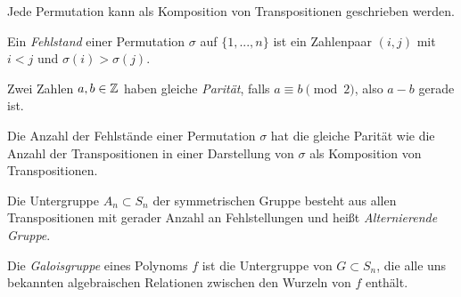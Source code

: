 \documentclass{cheat-sheet}
\begin{document}
\begin{bem}
  Jede Permutation kann als Komposition von Transpositionen geschrieben werden.
\end{bem}

\begin{defn}
  Ein \emph{Fehlstand} einer Permutation $\sigma$ auf $\{ 1, ..., n \}$ ist ein Zahlenpaar $(i, j)$ mit $i < j$ und $\sigma(i) > \sigma(j)$.
\end{defn}

\begin{defn}
  Zwei Zahlen $a, b \in \mathbb{Z}$ haben gleiche \emph{Parität}, falls $a \equiv b \pmod{2}$, also $a - b$ gerade ist.
\end{defn}

\begin{prop}
  Die Anzahl der Fehlstände einer Permutation $\sigma$ hat die gleiche Parität wie die Anzahl der Transpositionen in einer Darstellung von $\sigma$ als Komposition von Transpositionen.
\end{prop}

\begin{defn}
  Die Untergruppe $A_n \subset S_n$ der symmetrischen Gruppe besteht aus allen Transpositionen mit gerader Anzahl an Fehlstellungen und heißt \emph{Alternierende Gruppe}.
\end{defn}

\begin{defn}
  Die \emph{Galoisgruppe} eines Polynoms $f$ ist die Untergruppe von $G \subset S_n$, die alle uns bekannten algebraischen Relationen zwischen den Wurzeln von $f$ enthält.
\end{defn}
\end{document}
